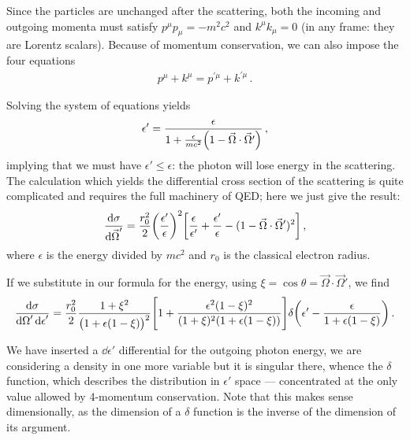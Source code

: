 \documentclass[main.tex]{subfiles}
\begin{document}
Since the particles are unchanged after the scattering, both the incoming and outgoing momenta must satisfy \(p^{\mu } p_{\mu } = - m^2 c^2\) and \(k^{\mu } k_{\mu } = 0\) (in any frame: they are Lorentz scalars). 
Because of momentum conservation, we can also impose the four equations 
%
\begin{align}
p^{\mu } + k^{\mu } = p^{\prime \mu } + k^{\prime \mu }
\,.
\end{align}

Solving the system of equations yields 
%
\begin{align}
\epsilon' = \frac{\epsilon }{1 + \frac{\epsilon }{mc^2} \qty(1 - \vec{\Omega} \cdot \vec{\Omega}')}
\,,
\end{align}
%
implying that we must have \(\epsilon' \leq \epsilon \): the photon will lose energy in the scattering. 
The calculation which yields the differential cross section of the scattering is quite complicated and requires the full machinery of QED; here we just give the result: 
%
\begin{align}
\frac{ \dd{\sigma }  }{ \dd{\vec{\Omega} }'} 
= \frac{r_0^2}{2 } \qty(\frac{\epsilon '}{\epsilon })^2
\qty[ \frac{\epsilon}{\epsilon '} + \frac{\epsilon'}{\epsilon } - (1 - \vec{\Omega} \cdot \vec{\Omega}')^2] 
\,,
\end{align}
%
where \(\epsilon \) is the energy divided by \(m c^2\) and \(r_0 \) is the classical electron radius. 

If we substitute in our formula for the energy, using \(\xi = \cos \theta = \vec{\Omega} \cdot \vec{\Omega}'\), we find 
%
\begin{align}
\frac{ \dd{\sigma }}{ \dd{\Omega }' \dd{\epsilon }'} 
= \frac{r_0^2}{2} \frac{1 + \xi^2}{\qty(1 + \epsilon (1 - \xi ))^2}
\qty[1 + \frac{\epsilon^2 (1 - \xi )^2}{(1 + \xi )^2 (1 + \epsilon (1 - \xi ))}]
\delta \qty(\epsilon ' - \frac{\epsilon }{1 + \epsilon (1 - \xi )})
\,.
\end{align}

We have inserted a \(\dd{\epsilon '}\) differential for the outgoing photon energy, we are considering a density in one more variable but it is singular there, whence the \(\delta \) function, which describes the distribution in \(\epsilon '\) space --- concentrated at the only value allowed by 4-momentum conservation. 
Note that this makes sense dimensionally, as the dimension of a \(\delta \) function is the inverse of the dimension of its argument. 
\end{document}
